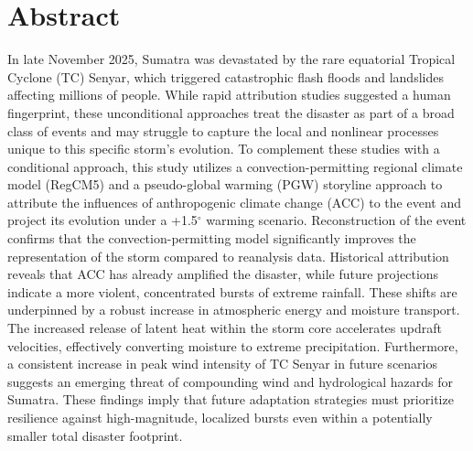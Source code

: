 \chapter*{Abstract} 
In late November 2025, Sumatra was devastated by the rare equatorial Tropical Cyclone (TC) Senyar, which triggered catastrophic flash floods and landslides affecting millions of people. While rapid attribution studies suggested a human fingerprint, these unconditional approaches treat the disaster as part of a broad class of events and may struggle to capture the local and nonlinear processes unique to this specific storm's evolution. To complement these studies with a conditional approach, this study utilizes a convection-permitting regional climate model (RegCM5) and a pseudo-global warming (PGW) storyline approach to attribute the influences of anthropogenic climate change (ACC) to the event and project its evolution under a +1.5$^\circ$ warming scenario. Reconstruction of the event confirms that the convection-permitting model significantly improves the representation of the storm compared to reanalysis data. Historical attribution reveals that ACC has already amplified the disaster, while future projections indicate a more violent, concentrated bursts of extreme rainfall. These shifts are underpinned by a robust increase in atmospheric energy and moisture transport. The increased release of latent heat within the storm core accelerates updraft velocities, effectively converting moisture to extreme precipitation. Furthermore, a consistent increase in peak wind intensity of TC Senyar in future scenarios suggests an emerging threat of compounding wind and hydrological hazards for Sumatra. These findings imply that future adaptation strategies must prioritize resilience against high-magnitude, localized bursts even within a potentially smaller total disaster footprint.




